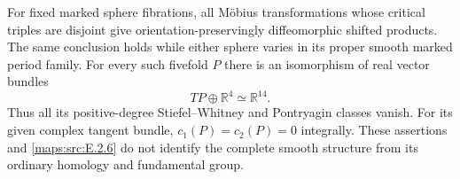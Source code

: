 \begin{proposition}\label{maps:src:E.2.7}


For fixed marked sphere fibrations, all M\"obius transformations
whose critical triples are disjoint give orientation-preservingly
diffeomorphic shifted products. The same conclusion holds while
either sphere varies in its proper smooth marked period family.
For every such fivefold $P$ there is an isomorphism of real vector
bundles
\[
 TP\oplus\mathbb R^4\simeq\mathbb R^{14}.
 \tag{E.MV9}\label{maps:eq:E.MV9}
\]
Thus all its positive-degree Stiefel--Whitney and Pontryagin
classes vanish. For its given complex tangent bundle,
$c_1(P)=c_2(P)=0$ integrally.
These assertions and \ref{maps:src:E.2.6} do not identify the complete smooth
structure from its ordinary homology and fundamental group.
\end{proposition}


